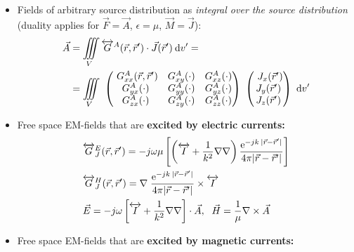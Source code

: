 \begin{itemize}
    \item Fields of arbitrary source distribution as \textit{integral over the source distribution} (duality applies for $\vec{F} = \vec{A}$, $\epsilon = \mu$, $\vec{M} = \vec{J}$):\\
        \begin{align*}
            \vec{A} &= \iiint\limits_V \overleftrightarrow{G}^A(\vec{r},\vec{r}^\prime) \cdot \vec{J}(\vec{r}^\prime)\:\mathrm{d}v^\prime =\\
            &= \iiint\limits_V\
            \begin{pmatrix}\
                G^A_{xx}(\vec{r},\vec{r}^\prime) & G^A_{xy}(\cdot) & G^A_{xz}(\cdot)\\
                G^A_{yx}(\cdot) & G^A_{yy}(\cdot) & G^A_{yz}(\cdot)\\
                G^A_{zx}(\cdot) & G^A_{zy}(\cdot) & G^A_{zz}(\cdot)
            \end{pmatrix}\
            \begin{pmatrix}\
                J_x(\vec{r}^\prime)\\
                J_y(\vec{r}^\prime)\\
                J_z(\vec{r}^\prime)
            \end{pmatrix}\
            \mathrm{d}v^\prime
        \end{align*}
    \item Free space EM-fields that are \textbf{excited by electric currents:}\\
        \begin{align*}
            &\overleftrightarrow{G}^E_J(\vec{r},\vec{r}^\prime) = -j\omega\mu\left[\left(\overleftrightarrow{I} + \dfrac{1}{k^2}\nabla\nabla\right) \dfrac{\mathrm{e}^{-jk\:|\vec{r} - \vec{r}^\prime|}}{4\pi|\vec{r} - \vec{r}^\prime|}\right]\\
            &\overleftrightarrow{G}^H_J(\vec{r},\vec{r}^\prime) = \nabla\;\dfrac{\mathrm{e}^{-jk\:|\vec{r} - \vec{r}^\prime|}}{4\pi|\vec{r} - \vec{r}^\prime|} \times \overleftrightarrow{I}\\
            &\vec{E} = -j\omega \left[\overleftrightarrow{I} + \dfrac{1}{k^2}\nabla\nabla\right] \cdot \vec{A},\;\
            \vec{H} = \dfrac{1}{\mu} \nabla \times \vec{A}
        \end{align*}
    \item Free space EM-fields that are \textbf{excited by magnetic currents:}\\
        \begin{align*}

\end{align*}
\end{itemize}
